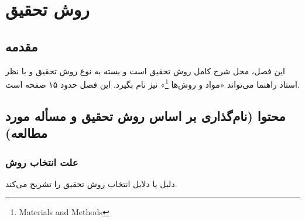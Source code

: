 \chapter{روش تحقیق}
\section{مقدمه} 
این فصل، محل شرح کامل روش تحقیق است و بسته به نوع روش تحقیق و با نظر استاد راهنما می‌تواند «مواد و روش‌ها%
\footnote{Materials and Methods}»
نیز نام بگیرد. این فصل حدود ۱۵ صفحه است.

\section{محتوا (نام‌گذاری بر اساس روش تحقیق و مسأله مورد مطالعه)}
\subsection{علت انتخاب روش}
دلیل یا دلایل انتخاب روش تحقیق را تشریح می‌کند.

